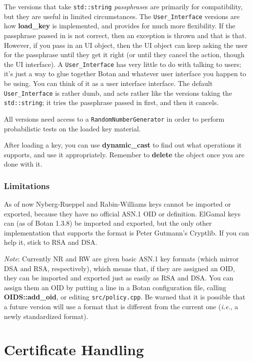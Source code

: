 \documentclass{article}
\newcommand{\filename}[1]{\texttt{#1}}
\newcommand{\function}[1]{\textbf{#1}}
\newcommand{\type}[1]{\texttt{#1}}
\renewcommand{\arg}[1]{\textsl{#1}}
\newcommand{\ie}[0]{\emph{i.e.}}
\begin{document}
The versions that take \type{std::string} \arg{passphrase}s are
primarily for compatibility, but they are useful in limited
circumstances. The \type{User\_Interface} versions are how
\function{load\_key} is implemented, and provides for much more
flexibility. If the passphrase passed in is not correct, then an
exception is thrown and that is that. However, if you pass in an UI
object, then the UI object can keep asking the user for the passphrase
until they get it right (or until they cancel the action, though the
UI interface). A \type{User\_Interface} has very little to do with
talking to users; it's just a way to glue together Botan and whatever
user interface you happen to be using. You can think of it as a user
interface interface. The default \type{User\_Interface} is rather
dumb, and acts rather like the versions taking the \type{std::string};
it tries the passphrase passed in first, and then it cancels.

All versions need access to a \type{RandomNumberGenerator} in order to
perform probabilistic tests on the loaded key material.

After loading a key, you can use \function{dynamic\_cast} to find out
what operations it supports, and use it appropriately. Remember to
\function{delete} the object once you are done with it.

\subsubsection{Limitations}

As of now Nyberg-Rueppel and Rabin-Williams keys cannot be imported or
exported, because they have no official ASN.1 OID or definition. ElGamal keys
can (as of Botan 1.3.8) be imported and exported, but the only other
implementation that supports the format is Peter Gutmann's Cryptlib. If you
can help it, stick to RSA and DSA.

\emph{Note}: Currently NR and RW are given basic ASN.1 key formats (which
mirror DSA and RSA, respectively), which means that, if they are assigned an
OID, they can be imported and exported just as easily as RSA and DSA. You can
assign them an OID by putting a line in a Botan configuration file, calling
\function{OIDS::add\_oid}, or editing \filename{src/policy.cpp}. Be warned that
it is possible that a future version will use a format that is different from
the current one (\ie, a newly standardized format).

\section{Certificate Handling}
\end{document}
